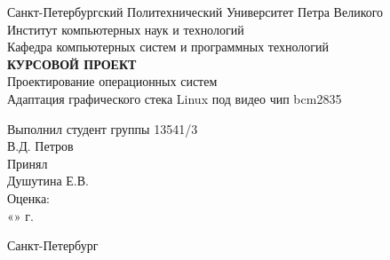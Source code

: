 
	\begin{center}		%

		Санкт-Петербургский Политехнический Университет Петра Великого\\
		Институт компьютерных наук и технологий \\
		Кафедра компьютерных систем и программных технологий\\[3cm]
		
		\huge \textbf{КУРСОВОЙ ПРОЕКТ}\\[0.5cm]
		\large Проектирование операционных систем\\[0.1cm]
		\large Адаптация графического стека Linux под видео чип bcm2835\\[2cm]

	\end{center}


	\begin{flushright} %

				\large Выполнил студент группы 13541/3\\
				\large В.Д. Петров\\[0.5cm]
				
				\large Принял\\
				\sign[4cm]\large  Душутина Е.В.\\
				\large Оценка: \sign\\
				«\underline{\hspace{0.7cm}}» \underline{\hspace{2cm}} \the\year г.

	\end{flushright}
	
	\vfill %

	\begin{center}
	\large Санкт-Петербург\\
	\large \the\year %
	\end{center} %

\thispagestyle{empty} %
\newpage
